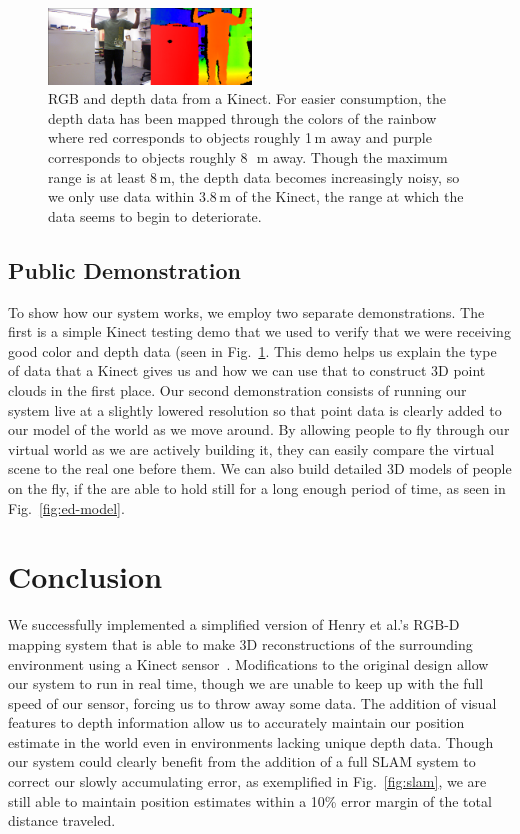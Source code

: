 \documentclass[letterpaper, 10pt, conference]{ieeeconf}
\begin{document}
\begin{figure}
\centering
\includegraphics[width=0.48\textwidth]{figures/KinectDemo.png}
\caption{RGB and depth data from a Kinect. For easier consumption, the depth
data has been mapped through the colors of the rainbow where red corresponds
to objects roughly 1\,m away and purple corresponds to objects roughly 8~\,m
away. Though the maximum range is at least 8\,m, the depth data
becomes increasingly noisy, so we only use data within 3.8\,m of the Kinect,
the range at which the data seems to begin to deteriorate.}
\label{fig:kinect-demo}
\end{figure}

\subsection{Public Demonstration}
To show how our system works, we employ two separate demonstrations. The first
is a simple Kinect testing demo that we used to verify that we were receiving
good color and depth data (seen in Fig.~\ref{fig:kinect-demo}. This demo helps
us explain the type of data that a Kinect gives us and how we can use that to
construct 3D point clouds in the first place. Our second demonstration
consists of running our system live at a slightly lowered resolution so that
point data is clearly added to our model of the world as we move around. By
allowing people to fly through our virtual world as we are actively building
it, they can easily compare the virtual scene to the real one before them. We
can also build detailed 3D models of people on the fly, if the are able to
hold still for a long enough period of time, as seen in Fig.~\ref{fig:ed-model}.

\section{Conclusion}
We successfully implemented a simplified version of Henry et al.'s RGB-D mapping
system that is able to make 3D reconstructions of the surrounding environment
using a Kinect sensor~\cite{Henry2010rgbd}. Modifications to the original
design allow our system to run in real time, though we are unable to keep up with
the full speed of our sensor, forcing us to throw away some data. The addition of
visual features to depth information allow us to accurately maintain our position
estimate in the world even in environments lacking unique depth data. Though our
system could clearly benefit from the addition of a full SLAM system to
correct our slowly accumulating error, as exemplified in Fig.~\ref{fig:slam},
 we are still able to maintain position
estimates within a 10\% error margin of the total distance traveled.
\end{document}
